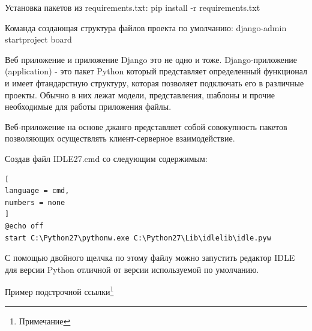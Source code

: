 \documentclass[%
	11pt,
	a4paper,
	utf8,
		]{article}
\begin{document}
Установка пакетов из requirements.txt: pip install -r requirements.txt 

Команда создающая структура файлов проекта по умолчанию: django-admin startproject board

Веб приложение и приложение Django это не одно и тоже. Django-приложение (application) - это пакет Python который представляет определенный функционал и имеет фтандарстную структуру, которая позволяет подключать его в различные проекты. Обычно в них лежат модели, представления, шаблоны и прочие необходимые для работы приложения файлы. 

Веб-приложение на основе джанго представляет собой совокупность пакетов позволяющих осуществлять клиент-серверное взаимодействие.







Создав файл IDLE27.cmd со следующим содержимым:
\begin{lstlisting}[
language = cmd,
numbers = none
]
@echo off
start C:\Python27\pythonw.exe C:\Python27\Lib\idlelib\idle.pyw
\end{lstlisting}


С помощью двойного щелчка по этому файлу можно запустить редактор IDLE для версии Python отличной от версии используемой по умолчанию.




\cite[стр.~34]{chacon:2020}


Пример подстрочной ссылки\footnote{Примечание}






\begin{thebibliography}{99}
	
\end{thebibliography}

\end{document}
